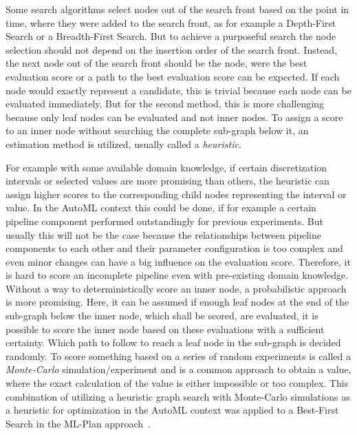 Some search algorithms select nodes out of the search front  based on the point in time, where they were added to the search front, as for example a Depth-First Search or a Breadth-First Search.
But to achieve a purposeful search the node selection should not depend on the insertion order of the search front.
Instead, the next node out of the search front should be the node, were the best evaluation score or a path to the best evaluation score can be expected.\newline
If each node would exactly represent a candidate, this is trivial because each node can be evaluated immediately.
But for the second method, this is more challenging because only leaf nodes can be evaluated and not inner nodes.
To assign a score to an inner node without searching the complete sub-graph below it, an estimation method is utilized, usually called a \textit{heuristic}.

For example with some available domain knowledge, if certain discretization intervals or selected values are more promising than others, the heuristic can assign higher scores to the corresponding child nodes representing the interval or value.
In the AutoML context this could be done, if for example a certain pipeline component performed outstandingly for previous experiments.
But usually this will not be the case because the relationships between pipeline components to each other and their parameter configuration is too complex and even minor changes can have a big influence on the evaluation score.
Therefore, it is hard to score an incomplete pipeline even with pre-existing domain knowledge.\newline
Without a way to deterministically score an inner node, a probabilistic approach is more promising.
Here, it can be assumed if enough leaf nodes at the end of the sub-graph below the inner node, which shall be scored, are evaluated, it is possible to score the inner node based on these evaluations with a sufficient certainty.
Which path to follow to reach a leaf node in the sub-graph is decided randomly.
To score something based on a series of random experiments is called a \textit{Monte-Carlo} simulation/experiment and is a common approach to obtain a value, where the exact calculation of the value is either impossible or too complex.
This combination of utilizing a heuristic graph search with Monte-Carlo simulations as a heuristic for optimization in the AutoML context was applied to a Best-First Search in the ML-Plan approach~\cite{Mohr-ML-Plan}.

